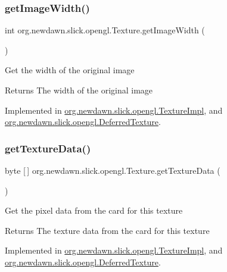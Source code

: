 \subsubsection{\texorpdfstring{get\+Image\+Width()}{getImageWidth()}}
{\footnotesize\ttfamily int org.\+newdawn.\+slick.\+opengl.\+Texture.\+get\+Image\+Width (\begin{DoxyParamCaption}{ }\end{DoxyParamCaption})}

Get the width of the original image

\begin{DoxyReturn}{Returns}
The width of the original image 
\end{DoxyReturn}


Implemented in \mbox{\hyperlink{classorg_1_1newdawn_1_1slick_1_1opengl_1_1_texture_impl_a2f52648ca0e408f5b5f7c34a71634a26}{org.\+newdawn.\+slick.\+opengl.\+Texture\+Impl}}, and \mbox{\hyperlink{classorg_1_1newdawn_1_1slick_1_1opengl_1_1_deferred_texture_a12271dcbc3878ff74af0aae565356904}{org.\+newdawn.\+slick.\+opengl.\+Deferred\+Texture}}.

\mbox{\label{interfaceorg_1_1newdawn_1_1slick_1_1opengl_1_1_texture_a84c7714d8bdd0e4a933a95ae33531ad7}} 
\subsubsection{\texorpdfstring{get\+Texture\+Data()}{getTextureData()}}
{\footnotesize\ttfamily byte \mbox{[}$\,$\mbox{]} org.\+newdawn.\+slick.\+opengl.\+Texture.\+get\+Texture\+Data (\begin{DoxyParamCaption}{ }\end{DoxyParamCaption})}

Get the pixel data from the card for this texture

\begin{DoxyReturn}{Returns}
The texture data from the card for this texture 
\end{DoxyReturn}


Implemented in \mbox{\hyperlink{classorg_1_1newdawn_1_1slick_1_1opengl_1_1_texture_impl_a1420a28b8b562c79d6053c927cc58f20}{org.\+newdawn.\+slick.\+opengl.\+Texture\+Impl}}, and \mbox{\hyperlink{classorg_1_1newdawn_1_1slick_1_1opengl_1_1_deferred_texture_a074da894ed12bfc8058c8bd65133a8c5}{org.\+newdawn.\+slick.\+opengl.\+Deferred\+Texture}}.

